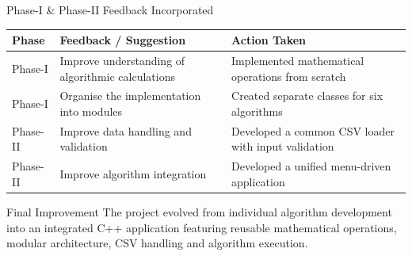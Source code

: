 \documentclass[aspectratio=169,11pt]{beamer}
\begin{document}
\begin{frame}{Phase-I \& Phase-II Feedback Incorporated}

\scriptsize

\begin{center}

\renewcommand{\arraystretch}{1.35}

\begin{tabularx}{.96\textwidth}
{@{}p{2.1cm}X X@{}}

\toprule
\textbf{Phase} &
\textbf{Feedback / Suggestion} &
\textbf{Action Taken}\\
\midrule

Phase-I &
{Improve understanding of algorithmic calculations} &
{Implemented mathematical operations from scratch}\\

Phase-I &
{Organise the implementation into modules} &
{Created separate classes for six algorithms}\\

Phase-II &
{Improve data handling and validation} &
{Developed a common CSV loader with input validation}\\

Phase-II &
{Improve algorithm integration} &
{Developed a unified menu-driven application}\\

\bottomrule

\end{tabularx}

\end{center}

\vfill

\begin{block}{Final Improvement}
{
The project evolved from individual algorithm development into an integrated C++ application featuring reusable mathematical operations, modular architecture, CSV handling and algorithm execution.
}
\end{block}

\end{frame}
\end{document}
